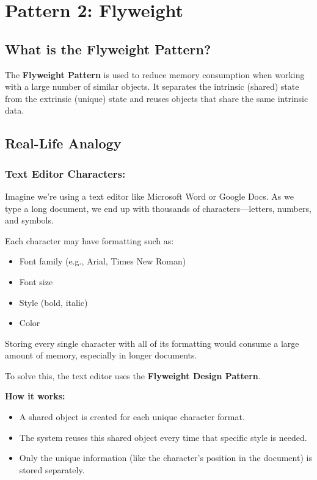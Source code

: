 \documentclass[12pt]{article}
\begin{document}
\section{Pattern 2: Flyweight}

\subsection{What is the Flyweight Pattern?}
The \textbf{Flyweight Pattern} is used to reduce memory consumption when working with a large number of similar objects. It separates the intrinsic (shared) state from the extrinsic (unique) state and reuses objects that share the same intrinsic data.

\subsection{Real-Life Analogy}
\subsubsection*{Text Editor Characters:}

Imagine we're using a text editor like Microsoft Word or Google Docs. As we type a long document, we end up with thousands of characters—letters, numbers, and symbols.

Each character may have formatting such as:
\begin{itemize}
    \item Font family (e.g., Arial, Times New Roman)
    \item Font size
    \item Style (bold, italic)
    \item Color
\end{itemize}

Storing every single character with all of its formatting would consume a large amount of memory, especially in longer documents.

To solve this, the text editor uses the \textbf{Flyweight Design Pattern}.

\vspace{1em}

\noindent\textbf{How it works:}
\begin{itemize}
    \item A shared object is created for each unique character format.
    \item The system reuses this shared object every time that specific style is needed.
    \item Only the unique information (like the character's position in the document) is stored separately.
\end{itemize}
\end{document}
